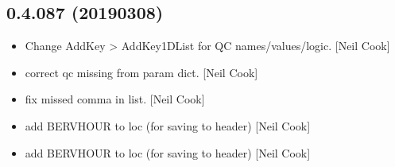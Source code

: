 \documentclass[a4paper,10pt,english]{report}
\begin{document}
\subsection{0.4.087 (2019\sphinxhyphen{}03\sphinxhyphen{}08)}
\label{\detokenize{misc/changelog:id193}}\begin{itemize}
\item {} 
Change AddKey \textendash{}\textgreater{} AddKey1DList for QC names/values/logic. {[}Neil Cook{]}

\item {} 
 \sphinxhyphen{} correct qc missing from param dict. {[}Neil
Cook{]}

\item {} 
 \sphinxhyphen{} fix missed comma in list. {[}Neil Cook{]}

\item {} 
 \sphinxhyphen{} add BERVHOUR to loc (for saving to header) {[}Neil Cook{]}

\item {} 
 \sphinxhyphen{} add BERVHOUR to loc (for saving to header) {[}Neil Cook{]}

\end{itemize}
\end{document}
